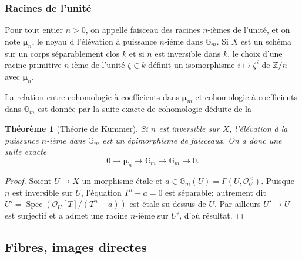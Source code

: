 \documentclass{article}
\DeclareMathOperator{\spec}{Spec}
\newcommand{\cO}{\mathcal{O}}
\newcommand{\dG}{\mathbb{G}}
\newcommand{\dmu}{\boldsymbol{\mu}}
\newcommand{\dZ}{\mathbb{Z}}
\newtheorem{theorem}[subsubsection]{Théorème}
\begin{document}
\subsubsection{Racines de l'unité}\label{2-2-4}

Pour tout entier $n>0$, on appelle faisceau des racines $n$-ièmes de 
l'unité, et on note $\dmu_n$, le noyau d l'élévation à puissance 
$n$-iéme dans $\dG_m$. Si $X$ est un schéma sur un corps séparablement 
clos $k$ et si $n$ est inversible dans $k$, le choix d'une racine primitive 
$n$-ième de l'unité $\zeta\in k$ définit un isomorphisme 
$i\mapsto \zeta^i$ de $\dZ/n$ avec $\dmu_n$. 

La relation entre cohomologie à coefficients dans $\dmu_m$ et cohomologie à 
coefficients dans $\dG_m$ est donnée par la suite exacte de cohomologie déduite 
de la 






\begin{theorem}[Théorie de Kummer]\label{2-2-5}
Si $n$ est inversible sur $X$, l'élévation à la puissance $n$-ième dans 
$\dG_m$ est un épimorphisme de faisceaux. On a donc une suite exacte 
\[
  0 \to \dmu_n \to \dG_m \to \dG_m \to 0\text{.}
\]
\end{theorem}
\begin{proof}
Soient $U\to X$ un morphisme étale et $a\in \dG_m(U) =\Gamma(U,\cO_U^\times)$. 
Puisque $n$ est inversible sur $U$, l'équation $T^n-a = 0$ est séparable; 
autrement dit $U'=\spec\left(\cO_U[T]/(T^n-a)\right)$ est étale su-dessus de 
$U$. Par ailleurs $U'\to U$ est surjectif et a admet une racine $n$-ième sur 
$U'$, d'où résultat. 
\end{proof}










\subsection{Fibres, images directes}\label{2-3}





\subsubsection{}\label{2-3-1}
\end{document}

